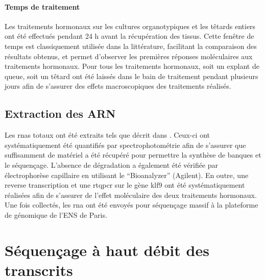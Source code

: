 \documentclass[../main.tex]{subfiles}
\begin{document}
\paragraph{Temps de traitement}
Les traitements hormonaux sur les cultures organotypiques et les têtards entiers ont été effectués pendant 24 h avant la récupération des tissus.
Cette fenêtre de temps est classiquement utilisée dans la littérature, facilitant la comparaison des résultats obtenus, et permet d'observer les premières réponses moléculaires aux traitements hormonaux.
Pour tous les traitements hormonaux, soit un explant de queue, soit un têtard ont été laissés dans le bain de traitement pendant plusieurs jours afin de s'assurer des effets macroscopiques des traitements réalisés.

\subsection{Extraction des ARN}

Les \glspl{rna} totaux ont été extraits tels que décrit dans \citet{Bilesimo2011}.
Ceux-ci ont systématiquement été quantifiés par spectrophotométrie afin de s'assurer que suffisamment de matériel a été récupéré pour permettre la synthèse de banques et le séquençage.
L'absence de dégradation a également été vérifiée par électrophorèse capillaire en utilisant le ``Bioanalyzer'' (Agilent).
En outre, une reverse transcription et une \gls{rtqpcr} sur le gène \gls{klf9} ont été systématiquement réalisées afin de s'assurer de l'effet moléculaire des deux traitements hormonaux.
Une fois collectés, les \gls{rna} ont été envoyés pour séquençage massif à la plateforme de génomique de l'ENS de Paris.




\section{Séquençage à haut débit des transcrits}
\end{document}
